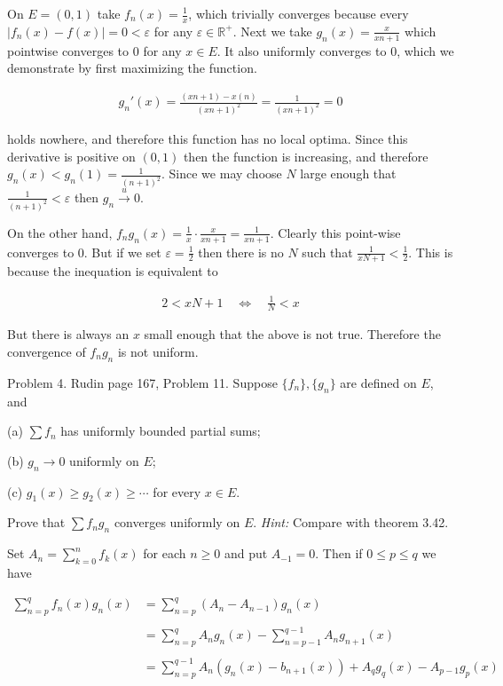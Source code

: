 \documentclass{article}
\begin{document}
  \vspace{1cm} 

  On $E=(0,1)$ take $f_n(x)=\frac 1 x$, which trivially converges because every $|f_n(x)-f(x)|=0<\varepsilon$ for any $\varepsilon\in\mathbb R^+$.  Next we take $g_n(x) = \frac{x}{xn+1}$ which pointwise converges to 0 for any $x\in E$.  It also uniformly converges to 0, which we demonstrate by first maximizing the function.  

  \begin{align*}
    g_n'(x) = \frac{(xn+1)-x(n)}{(xn+1)^2} = \frac{1}{(xn+1)^2}=0
  \end{align*}

  holds nowhere, and therefore this function has no local optima.  Since this derivative is positive on $(0,1)$ then the function is increasing, and therefore $g_n(x) < g_n(1) = \frac{1}{(n+1)^2}$.  Since we may choose $N$ large enough that $\frac{1}{(n+1)^2}<\varepsilon$ then $g_n\xrightarrow[]{u}0$.  

  On the other hand, $f_ng_n(x) = \frac 1 x \cdot \frac{x}{xn+1} = \frac{1}{xn+1}$.  Clearly this point-wise converges to 0.  But if we set $\varepsilon = \frac 1 2$ then there is no $N$ such that $\frac{1}{xN+1}<\frac 1 2$.  This is because the inequation is equivalent to 

  \begin{align*}
    2 < xN+1 \quad \Leftrightarrow \quad \frac{1}{N} < x
  \end{align*}

  But there is always an $x$ small enough that the above is not true.  Therefore the convergence of $f_ng_n$ is not uniform.

\pagebreak
  
  {\Large \color{Sepia} Problem 4. Rudin page 167, Problem 11. Suppose $\{f_n\},\{g_n\}$ are defined on $E$, and 

  (a) $\sum f_n$ has uniformly bounded partial sums;

  (b) $g_n\to 0$ uniformly on $E$; 

  (c) $g_1(x) \ge g_2(x)\ge \cdots$ for every $x\in E$.

  Prove that $\sum f_ng_n$ converges uniformly on $E$.  {\it Hint:} Compare with theorem 3.42.}

  \vspace{1cm} 

  Set $A_n = \sum_{k=0}^n f_k(x)$ for each $n\ge 0$ and put $A_{-1}=0$.  Then if $0\le p\le q$ we have 

  \begin{align*}
    \sum_{n=p}^q f_n(x)g_n(x) &= \sum_{n=p}^q (A_n-A_{n-1})g_n(x) \\\\
    &= \sum_{n=p}^q A_ng_n(x)-\sum_{n=p-1}^{q-1}A_ng_{n+1}(x) \\\\
    &= \sum_{n=p}^{q-1} A_n(g_n(x)-b_{n+1}(x)) + A_qg_q(x)-A_{p-1}g_p(x)
  \end{align*}
\end{document}

